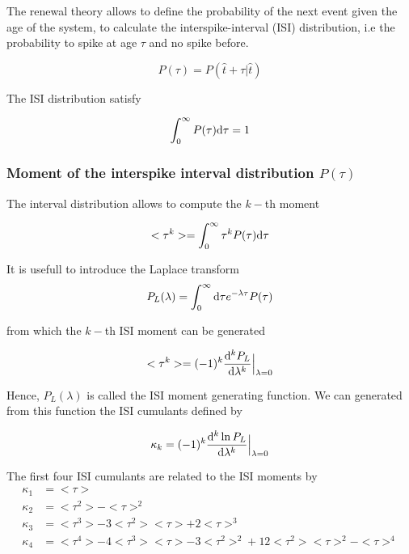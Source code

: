 \documentclass[a4paper,11pt,twoside]{article}
\def \dd  {{\rm d}}
\numberwithin{equation}{section}
\begin{document}
The renewal theory allows to define the probability of the next event given the age of the system, to calculate the interspike-interval (ISI) distribution, i.e the probability to spike at age $\tau$ and no spike before.

\begin{equation}
\label{eq:P1}
P(\tau)=P(\hat{t}+\tau| \hat{t})
\end{equation}

The ISI distribution satisfy

\begin{equation}
\label{eq:Pnorm}
\int_0^\infty P(\tau)\dd\tau=1 
\end{equation}

\subsubsection{Moment of the interspike interval distribution $P(\tau)$}
The interval distribution allows to compute the $k-$th moment

\begin{equation}
\label{eq:Pmoment}
<\tau^k>=\int_0^\infty \tau^kP(\tau)\dd\tau
\end{equation}


It is usefull to introduce the Laplace transform
\begin{equation}
\label{eq:Plaplace}
P_L(\lambda)=\int_0^\infty\dd\tau e^{-\lambda \tau}P(\tau)
\end{equation}

from which the  $k-$th ISI moment can be generated

\begin{equation}
\label{eq:Pmoment2}
<\tau^k>=(-1)^k\frac{\dd^k P_L}{\dd \lambda^k}\Bigr|_{\lambda=0}
\end{equation}

Hence, $P_L(\lambda)$ is called the ISI moment generating function. We can generated from this function the ISI cumulants defined by

\begin{equation}
\label{eq:Pcumulant}
\kappa_k=(-1)^k\frac{\dd^k \ln P_L}{\dd \lambda^k}\Bigr|_{\lambda=0}
\end{equation}

The first four ISI cumulants are related to the ISI moments by
\begin{align}
\label{eq:kappa1234}
\kappa_1&=<\tau>\\
\kappa_2&=<\tau^2>-<\tau>^2\\
\kappa_3&=<\tau^3> -3<\tau^2><\tau>+2<\tau>^3\\
\kappa_4&=<\tau^4>-4<\tau^3><\tau>-3<\tau^2>^2+12<\tau^2><\tau>^2-<\tau>^4\\
\end{align}
\end{document}

